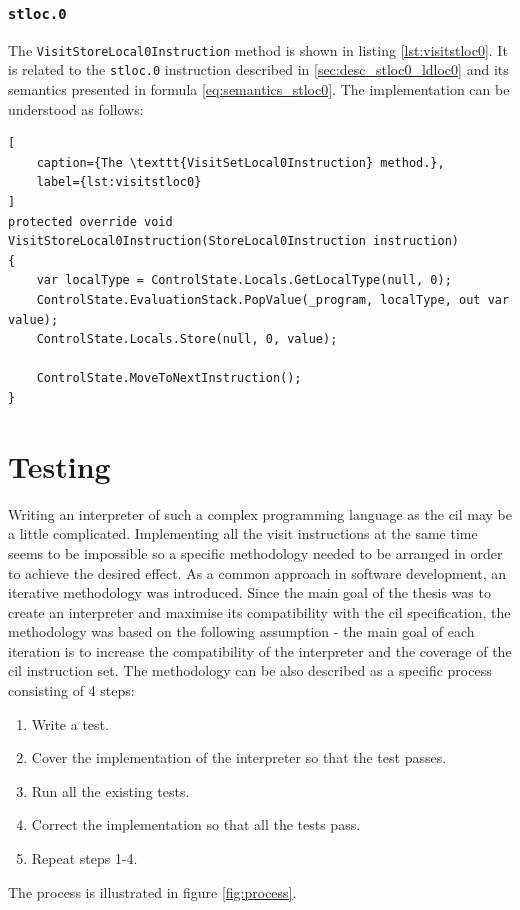 \documentclass{article}
\numberwithin{equation}{section}
\begin{document}
\subsubsection{\texttt{stloc.0}}

The \texttt{VisitStoreLocal0Instruction} method is shown in listing \ref{lst:visitstloc0}. It is related to the \texttt{stloc.0} instruction described in \ref{sec:desc_stloc0_ldloc0} and its semantics presented in formula \ref{eq:semantics_stloc0}. The implementation can be understood as follows:


\begin{lstlisting}[
	caption={The \texttt{VisitSetLocal0Instruction} method.},
	label={lst:visitstloc0}
]
protected override void VisitStoreLocal0Instruction(StoreLocal0Instruction instruction)
{
	var localType = ControlState.Locals.GetLocalType(null, 0);
	ControlState.EvaluationStack.PopValue(_program, localType, out var value);
	ControlState.Locals.Store(null, 0, value);

	ControlState.MoveToNextInstruction();
}
\end{lstlisting}

\clearpage


\section{Testing}

Writing an interpreter of such a complex programming language as the \acrshort{cil} may be a little complicated. Implementing all the visit instructions at the same time seems to be impossible so a specific methodology needed to be arranged in order to achieve the desired effect. As a common approach in software development, an iterative methodology was introduced. Since the main goal of the thesis was to create an interpreter and maximise its compatibility with the \acrshort{cil} specification, the methodology was based on the following assumption - the main goal of each iteration is to increase the compatibility of the interpreter and the coverage of the \acrshort{cil} instruction set. The methodology can be also described as a specific process consisting of 4 steps:
\begin{enumerate}
	\item{Write a test.}
	\item{Cover the implementation of the interpreter so that the test passes.}
	\item{Run all the existing tests.}
	\item{Correct the implementation so that all the tests pass.}
	\item{Repeat steps 1-4.}
\end{enumerate}
The process is illustrated in figure \ref{fig:process}.
\end{document}
